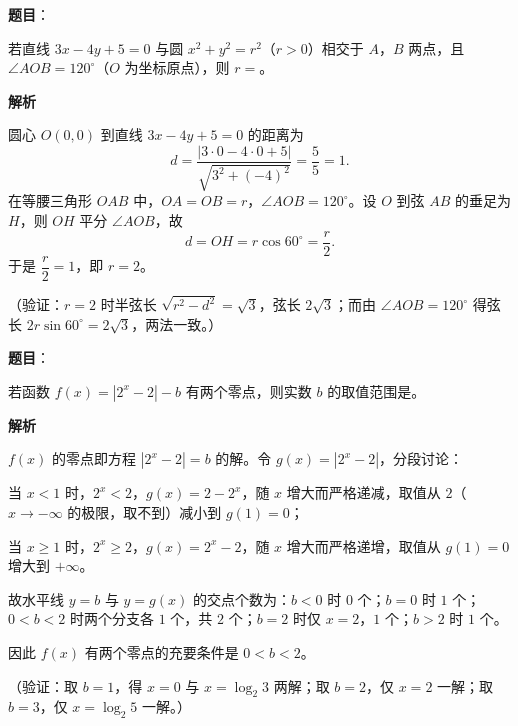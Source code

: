 \begin{answer}

\textbf{题目}：

若直线 \(3x-4y+5=0\) 与圆 \(x^2+y^2=r^2\)（\(r>0\)）相交于 \(A\)，\(B\) 两点，且 \(\angle AOB=120^\circ\)（\(O\) 为坐标原点），则 \(r=\)\gkblank{}。

\textbf{解析}

圆心 \(O(0,0)\) 到直线 \(3x-4y+5=0\) 的距离为
\nopagebreak[4]
\[
d=\dfrac{|3\cdot0-4\cdot0+5|}{\sqrt{3^2+(-4)^2}}=\dfrac55=1.
\]
在等腰三角形 \(OAB\) 中，\(OA=OB=r\)，\(\angle AOB=120^\circ\)。设 \(O\) 到弦 \(AB\) 的垂足为 \(H\)，则 \(OH\) 平分 \(\angle AOB\)，故
\nopagebreak[4]
\[
d=OH=r\cos60^\circ=\dfrac r2.
\]
于是 \(\dfrac r2=1\)，即 \(r=2\)。

（验证：\(r=2\) 时半弦长 \(\sqrt{r^2-d^2}=\sqrt3\)，弦长 \(2\sqrt3\)；而由 \(\angle AOB=120^\circ\) 得弦长 \(2r\sin60^\circ=2\sqrt3\)，两法一致。）


\end{answer}
\begin{answer}

\textbf{题目}：

若函数 \(f(x)=|2^x-2|-b\) 有两个零点，则实数 \(b\) 的取值范围是\gkblank{}。

\textbf{解析}

\(f(x)\) 的零点即方程 \(|2^x-2|=b\) 的解。令 \(g(x)=|2^x-2|\)，分段讨论：

当 \(x<1\) 时，\(2^x<2\)，\(g(x)=2-2^x\)，随 \(x\) 增大而严格递减，取值从 \(2\)（\(x\to-\infty\) 的极限，取不到）减小到 \(g(1)=0\)；

当 \(x\geqslant1\) 时，\(2^x\geqslant2\)，\(g(x)=2^x-2\)，随 \(x\) 增大而严格递增，取值从 \(g(1)=0\) 增大到 \(+\infty\)。

故水平线 \(y=b\) 与 \(y=g(x)\) 的交点个数为：\(b<0\) 时 \(0\) 个；\(b=0\) 时 \(1\) 个；\(0<b<2\) 时两个分支各 \(1\) 个，共 \(2\) 个；\(b=2\) 时仅 \(x=2\)，\(1\) 个；\(b>2\) 时 \(1\) 个。

因此 \(f(x)\) 有两个零点的充要条件是 \(0<b<2\)。

（验证：取 \(b=1\)，得 \(x=0\) 与 \(x=\log_2 3\) 两解；取 \(b=2\)，仅 \(x=2\) 一解；取 \(b=3\)，仅 \(x=\log_2 5\) 一解。）


\end{answer}
